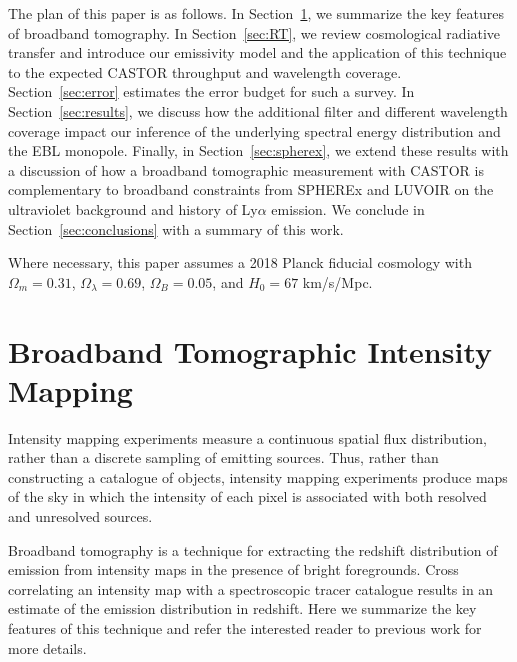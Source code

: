 \documentclass[fleqn,usenatbib]{mnras}
\begin{document}
The plan of this paper is as follows. In Section~\ref{sec:1}, we summarize the key features of broadband tomography.  In Section~\ref{sec:RT}, we review cosmological radiative transfer and introduce our emissivity model and the application of this technique to the expected CASTOR throughput and wavelength coverage.  Section~\ref{sec:error} estimates the error budget for such a survey.  In Section~\ref{sec:results}, we discuss how the additional filter and different wavelength coverage impact our inference of the underlying spectral energy distribution and the EBL monopole.  Finally, in Section~\ref{sec:spherex}, we extend these results with a discussion of how a broadband tomographic measurement with CASTOR is complementary to broadband constraints from {\small SPHEREx} and {\small LUVOIR} on the ultraviolet background and history of Ly$\alpha$ emission. We conclude in Section~\ref{sec:conclusions} with a summary of this work. 

Where necessary, this paper assumes a 2018 Planck fiducial cosmology \citep{Planck2018} with $\Omega_m = 0.31$, $\Omega_{\lambda} = 0.69$, $\Omega_{B} = 0.05$, and  $H_0 = 67$ km/s/Mpc.


\section{Broadband Tomographic Intensity Mapping} \label{sec:1}

Intensity mapping experiments measure a continuous spatial flux distribution, rather than a discrete sampling of emitting sources. Thus, rather than constructing a catalogue of objects, intensity mapping experiments produce maps of the sky in which the intensity of each pixel is associated with both resolved and unresolved sources.

Broadband tomography \citep{Chiang_2019} is a technique for extracting the redshift distribution of emission from intensity maps in the presence of bright foregrounds. Cross correlating an intensity map with a spectroscopic tracer catalogue results in an estimate of the emission distribution in redshift. Here we summarize the key features of this technique and refer the interested reader to previous work for more details. 
\end{document}
